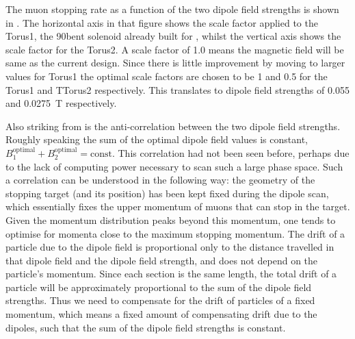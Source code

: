 \FigOptimMuBeamDipolePiStops

The muon stopping rate as a function of the two dipole field strengths is shown in .
The horizontal axis in that figure shows the scale factor applied to the Torus1, the 90\degree bent solenoid already built for \phaseI, whilst the vertical axis shows the scale factor for the Torus2.
A scale factor of 1.0 means the magnetic field will be same as the current \phaseI design.
Since there is little improvement by moving to larger values for Torus1 the optimal scale factors are chosen to be 1 and 0.5 for the Torus1 and TTorus2 respectively.  
This translates to dipole field strengths of 0.055 and 0.0275~T respectively.

Also striking from  is the anti-correlation between the two dipole field strengths.  
Roughly speaking the sum of the optimal dipole field values is constant, \ie $B_1^\text{optimal} + B_2^\text{optimal} = \text{const}$.
This correlation had not been seen before, perhaps due to the lack of computing power necessary to scan such a large phase space.
Such a correlation can be understood in the following way:
the geometry of the stopping target (and its position) has been kept fixed during the dipole scan, which
essentially fixes the upper momentum of muons that can stop in the target.
Given the momentum distribution peaks beyond this momentum, one tends to optimise for momenta close to the maximum stopping momentum.
The drift of a particle due to the dipole field is proportional only to the distance travelled in that dipole field and the dipole field strength, and does not depend on the particle's momentum.
Since each section is the same length, the total drift of a particle will be approximately proportional to the sum of the dipole field strengths.
Thus we need to compensate for the drift of particles of a fixed momentum, which means a fixed amount of compensating drift due to the dipoles, such that the sum of the dipole field strengths is constant.
